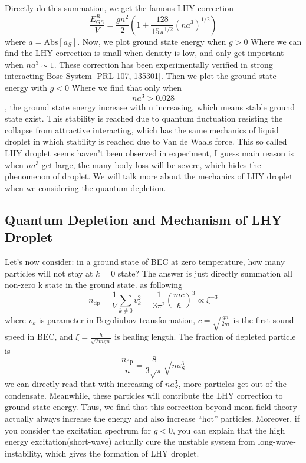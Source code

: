 Directly do this summation, we get the famous LHY correction
\begin{equation}
\frac{E_{\text{GS}}^R}{V}=\frac{g n^2}{2}\left(1+\frac{128}{15\pi ^{1/2}} \left(n a^3\right)^{1/2}\right)
\end{equation}
where $a=\text{Abs}\left[a_S\right]$. Now, we plot ground state energy when $g>0$
Where we can find the LHY correction is small when density is low, and only get important when $n a^3\sim 1$. These correction has been experimentally verified in strong interacting Bose System [PRL 107, 135301].
Then we plot the ground state energy with $g<0$
Where we find that only when \begin{equation}n a^3>0.028\end{equation}, the ground state energy increase with n increasing, which means stable ground state exist. This stability is reached due to quantum fluctuation resisting the collapse from attractive interacting, which has the same mechanics of liquid droplet in which stability is reached due to Van de Waals force. This so called LHY droplet seems haven{'}t been observed in experiment, I guess main reason is when $n a^3$ get large, the many body loss will be severe, which hides the phenomenon of droplet. We will talk more about the mechanics of LHY droplet when we considering the quantum depletion.

\subsection{Quantum Depletion and Mechanism of LHY Droplet}
Let's now consider: in a ground state of BEC at zero temperature, how many particles will not stay at $k=0$ state? The answer is just directly summation all non-zero k state in the ground state. as following
\begin{equation}
n_{\text{dp}}=\frac{1}{V}\sum _{k\neq 0} v_k^2=\frac{1}{3\pi ^2}\left(\frac{m c}{\hbar }\right)^3\propto \xi ^{-3}
\end{equation}
where $v_k$ is parameter in Bogoliubov transformation, $c =\sqrt{\frac{g n}{2m}}$ is the first sound speed in BEC, and $\xi =\frac{\hbar }{\sqrt{2m g n}}$ is healing length.
The fraction of depleted particle is
\begin{equation}
\frac{n_{\text{dp}}}{n}=\frac{8}{3\sqrt{\pi }}\sqrt{n a_S^3}
\end{equation}
we can directly read that with increasing of $n a_S^3$, more particles get out of the condensate. Meanwhile, these particles will contribute the LHY correction to ground state energy. Thus, we find that this correction beyond mean field theory actually always increase the energy and also increase {``}hot{''} particles. Moreover, if you consider the excitation spectrum for $g<0$, you can explain that the high energy excitation(short-wave)
actually cure the unstable system from long-wave-instability, which gives the formation of LHY droplet.

